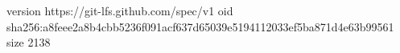 version https://git-lfs.github.com/spec/v1
oid sha256:a8feee2a8b4cbb5236f091acf637d65039e5194112033ef5ba871d4e63b99561
size 2138
